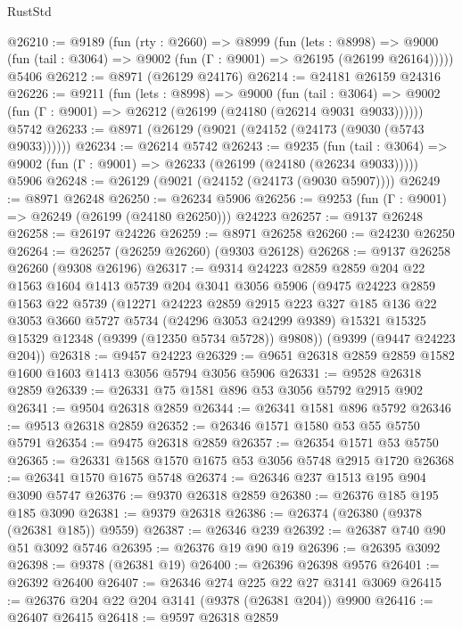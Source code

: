 \begin{lexlean}{RustStd}
\begin{coremodule}
@26210 := @9189
    (fun (rty : @2660) =>
    @8999
      (fun (lets : @8998) =>
      @9000 (fun (tail : @3064) => @9002 (fun (Γ : @9001) => @26195 (@26199 @26164)))))
    @5406
@26212 := @8971 (@26129 @24176)
@26214 := @24181 @26159 @24316
@26226 := @9211
    (fun (lets : @8998) =>
    @9000
      (fun (tail : @3064) =>
      @9002 (fun (Γ : @9001) => @26212 (@26199 (@24180 (@26214 @9031 @9033))))))
    @5742
@26233 := @8971 (@26129 (@9021 (@24152 (@24173 (@9030 (@5743 @9033))))))
@26234 := @26214 @5742
@26243 := @9235
    (fun (tail : @3064) => @9002 (fun (Γ : @9001) => @26233 (@26199 (@24180 (@26234 @9033)))))
    @5906
@26248 := @26129 (@9021 (@24152 (@24173 (@9030 @5907))))
@26249 := @8971 @26248
@26250 := @26234 @5906
@26256 := @9253 (fun (Γ : @9001) => @26249 (@26199 (@24180 @26250))) @24223
@26257 := @9137 @26248
@26258 := @26197 @24226
@26259 := @8971 @26258
@26260 := @24230 @26250
@26264 := @26257 (@26259 @26260) (@9303 @26128)
@26268 := @9137 @26258 @26260 (@9308 @26196)
@26317 := @9314
    @24223
    @2859
    @2859
    @204
    @22
    @1563
    @1604
    @1413
    @5739
    @204
    @3041
    @3056
    @5906
    (@9475
      @24223
      @2859
      @1563
      @22
      @5739
      (@12271
        @24223
        @2859
        @2915
        @223
        @327
        @185
        @136
        @22
        @3053
        @3660
        @5727
        @5734
        (@24296 @3053 @24299 @9389)
        @15321
        @15325
        @15329
        @12348
        (@9399 (@12350 @5734 @5728))
        @9808))
    (@9399 (@9447 @24223 @204))
@26318 := @9457 @24223
@26329 := @9651 @26318 @2859 @2859 @1582 @1600 @1603 @1413 @3056 @5794 @3056 @5906
@26331 := @9528 @26318 @2859
@26339 := @26331 @75 @1581 @896 @53 @3056 @5792 @2915 @902
@26341 := @9504 @26318 @2859
@26344 := @26341 @1581 @896 @5792
@26346 := @9513 @26318 @2859
@26352 := @26346 @1571 @1580 @53 @55 @5750 @5791
@26354 := @9475 @26318 @2859
@26357 := @26354 @1571 @53 @5750
@26365 := @26331 @1568 @1570 @1675 @53 @3056 @5748 @2915 @1720
@26368 := @26341 @1570 @1675 @5748
@26374 := @26346 @237 @1513 @195 @904 @3090 @5747
@26376 := @9370 @26318 @2859
@26380 := @26376 @185 @195 @185 @3090
@26381 := @9379 @26318
@26386 := @26374 (@26380 (@9378 (@26381 @185)) @9559)
@26387 := @26346 @239
@26392 := @26387 @740 @90 @51 @3092 @5746
@26395 := @26376 @19 @90 @19
@26396 := @26395 @3092
@26398 := @9378 (@26381 @19)
@26400 := @26396 @26398 @9576
@26401 := @26392 @26400
@26407 := @26346 @274 @225 @22 @27 @3141 @3069
@26415 := @26376 @204 @22 @204 @3141 (@9378 (@26381 @204)) @9900
@26416 := @26407 @26415
@26418 := @9597 @26318 @2859

\end{coremodule}
\end{lexlean}
